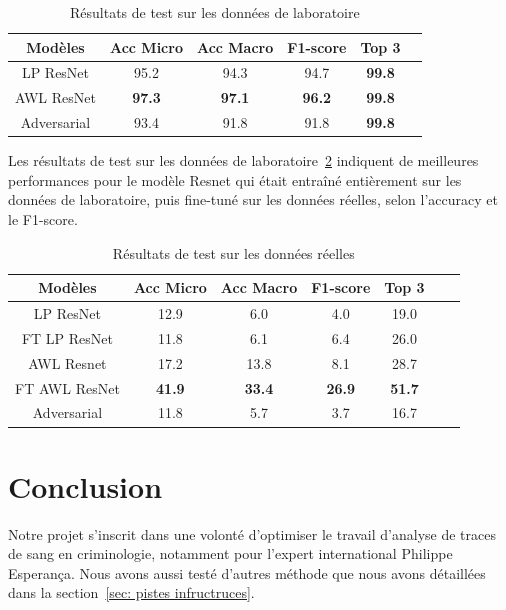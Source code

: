 \documentclass[a4paper]{article}
\begin{document}
\begin{table}[ht]
  \centering
    \begin{tabular}{cccccc}
    \toprule
    Modèles & Acc Micro & Acc Macro & F1-score & Top 3 \\
    \midrule
    LP ResNet & 95.2 & 94.3 & 94.7 & \textbf{99.8} \\
    AWL ResNet & \textbf{97.3} & \textbf{97.1} & \textbf{96.2} & \textbf{99.8} \\
    Adversarial & 93.4 & 91.8 & 91.8 & \textbf{99.8} \\
    \bottomrule
    \end{tabular}
    \caption{Résultats de test sur les données de laboratoire}
    \label{tab:results_lab}
\end{table}

Les résultats de test sur les données de laboratoire~\ref{tab: results_real} indiquent de meilleures performances pour le modèle Resnet qui était entraîné entièrement sur les données de laboratoire, puis fine-tuné sur les données réelles, selon l'accuracy et le F1-score. 

\begin{table}[ht]
  \centering
    \begin{tabular}{ccccccc}
    \toprule
    Modèles & Acc Micro & Acc Macro & F1-score & Top 3 \\
    \midrule
    LP ResNet & 12.9 & 6.0 & 4.0 & 19.0 \\
    FT LP ResNet & 11.8 & 6.1 & 6.4 & 26.0 \\
    AWL Resnet & 17.2 & 13.8 & 8.1 & 28.7 \\
    FT AWL ResNet & \textbf{41.9} & \textbf{33.4} & \textbf{26.9} & \textbf{51.7} \\
    Adversarial & 11.8 & 5.7 & 3.7 & 16.7 \\
    \bottomrule
    \end{tabular}
    \caption{Résultats de test sur les données réelles}
    \label{tab: results_real}
\end{table}

\section{Conclusion}

Notre projet s'inscrit dans une volonté d'optimiser le travail d'analyse de traces de sang en criminologie, notamment pour l'expert international Philippe Esperança. 
Nous avons aussi testé d'autres méthode que nous avons détaillées dans la section~\ref{sec: pistes infructruces}.
\end{document}

